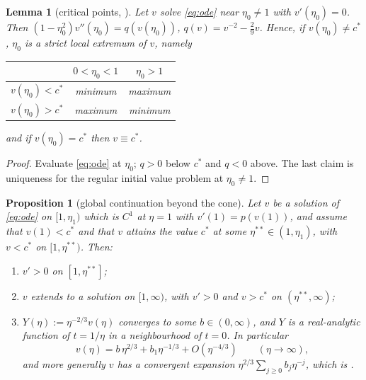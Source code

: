 \documentclass[11pt,a4paper]{amsart}
\newtheorem{proposition}[theorem]{Proposition}
\newtheorem{lemma}[theorem]{Lemma}
\theoremstyle{definition}
\theoremstyle{remark}
\newcommand{\cstar}{c^{*}}
\begin{document}
\begin{lemma}[critical points, {\cite[\S2(b)(a)--(d)]{GHL22}}]\label{lem:extrema}
Let $v$ solve \eqref{eq:ode} near $\eta_0\ne1$ with $v'(\eta_0)=0$.  Then $(1-\eta_0^2)v''(\eta_0)=q(v(\eta_0))$, $q(v)=v^{-2}-\frac29v$.  Hence, if $v(\eta_0)\ne\cstar$, $\eta_0$ is a strict local extremum of $v$, namely
\begin{center}
\begin{tabular}{lcc}\toprule
 & $0<\eta_0<1$ & $\eta_0>1$\\ \midrule
$v(\eta_0)<\cstar$ & minimum & maximum\\
$v(\eta_0)>\cstar$ & maximum & minimum\\ \bottomrule
\end{tabular}
\end{center}
and if $v(\eta_0)=\cstar$ then $v\equiv\cstar$.
\end{lemma}
\begin{proof}
Evaluate \eqref{eq:ode} at $\eta_0$; $q>0$ below $\cstar$ and $q<0$ above.  The last claim is uniqueness for the regular initial value problem at $\eta_0\neq 1$.
\end{proof}

\begin{proposition}[global continuation beyond the cone]\label{prop:beyond}
Let $v$ be a solution of \eqref{eq:ode} on $[1,\eta_1)$ which is $C^1$ at $\eta=1$ with $v'(1)=p(v(1))$, and assume that $v(1)<\cstar$ and that $v$ attains the value $\cstar$ at some $\eta^{**}\in(1,\eta_1)$, with $v<\cstar$ on $[1,\eta^{**})$.  Then:
\begin{enumerate}
\item $v'>0$ on $[1,\eta^{**}]$;
\item $v$ extends to a solution on $[1,\infty)$, with $v'>0$ and $v>\cstar$ on $(\eta^{**},\infty)$;
\item $Y(\eta):=\eta^{-2/3}v(\eta)$ converges to some $b\in(0,\infty)$, and $Y$ is a real-analytic function of $t=1/\eta$ in a neighbourhood of $t=0$.  In particular
\begin{equation}\label{eq:infinity}
v(\eta)=b\,\eta^{2/3}+b_1\eta^{-1/3}+O(\eta^{-4/3})\qquad(\eta\to\infty),
\end{equation}
and more generally $v$ has a convergent expansion $\eta^{2/3}\sum_{j\ge0}b_j\eta^{-j}$, which is \cite[Lemma 2.4]{GHL22}.
\end{enumerate}
\end{proposition}
\end{document}
